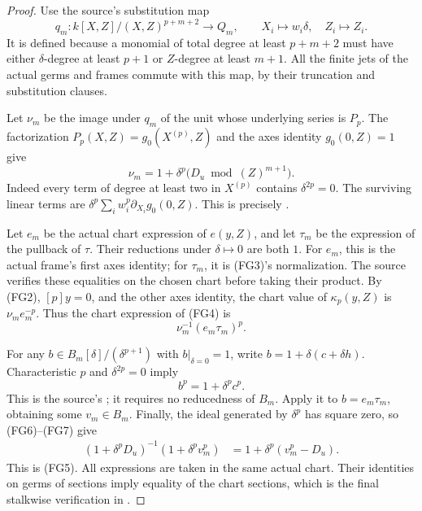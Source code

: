 \begin{proof}
Use the source's substitution map
\[
 q_m:
 k[X,Z]/(X,Z)^{p+m+2}\longrightarrow Q_m,\qquad
                         X_i\mapsto w_i\delta,\quad Z_i\mapsto Z_i.
\]
It is defined because a monomial of total degree at least
\(p+m+2\) must have either \(\delta\)-degree at least \(p+1\)
or \(Z\)-degree at least \(m+1\).
All the finite jets of the actual germs and frames commute
with this map, by their truncation and substitution clauses.

Let \(\nu_m\) be the image under \(q_m\) of the unit whose
underlying series is \(P_p\).
The factorization \(P_p(X,Z)=g_0(X^{(p)},Z)\) and the
axes identity \(g_0(0,Z)=1\) give
\[
                \nu_m
                =1+\delta^p\bigl(D_u\bmod(Z)^{m+1}\bigr).
 \tag{FG6}\label{eq:faithful-nu-jet}
\]
Indeed every term of degree at least two in \(X^{(p)}\)
contains \(\delta^{2p}=0\).
The surviving linear terms are
\(\delta^p\sum_iw_i^p\partial_{X_i}g_0(0,Z)\).
This is precisely
.

Let \(e_m\) be the actual chart expression of \(e(y,Z)\),
and let \(\tau_m\) be the expression of the pullback of
\(\tau\).
Their reductions under \(\delta\mapsto0\) are both \(1\).
For \(e_m\), this is the actual frame's first axes identity;
for \(\tau_m\), it is (FG3)'s normalization.
The source verifies these equalities on the chosen chart
before taking their product.
By (FG2), \([p]y=0\), and the other axes identity,
the chart value of \(\kappa_p(y,Z)\) is
\(\nu_m e_m^{-p}\).
Thus the chart expression of (FG4) is
\[
                              \nu_m^{-1}(e_m\tau_m)^p.
 \tag{FG7}\label{eq:faithful-C-local-product}
\]

For any \(b\in B_m[\delta]/(\delta^{p+1})\) with
\(b|_{\delta=0}=1\), write
\(b=1+\delta(c+\delta h)\).
Characteristic \(p\) and \(\delta^{2p}=0\) imply
\[
                              b^p=1+\delta^pc^p.
\]
This is the source's
;
it requires no reducedness of \(B_m\).
Apply it to \(b=e_m\tau_m\), obtaining some \(v_m\in B_m\).
Finally, the ideal generated by \(\delta^p\) has square zero,
so (FG6)--(FG7) give
\[
 \begin{split}
 (1+\delta^pD_u)^{-1}(1+\delta^pv_m^p)
                         &=1+\delta^p(v_m^p-D_u).
 \end{split}
\]
This is (FG5).
All expressions are taken in the same actual chart.
Their identities on germs of sections imply equality
of the chart sections, which is the final stalkwise
verification in .
\end{proof}

